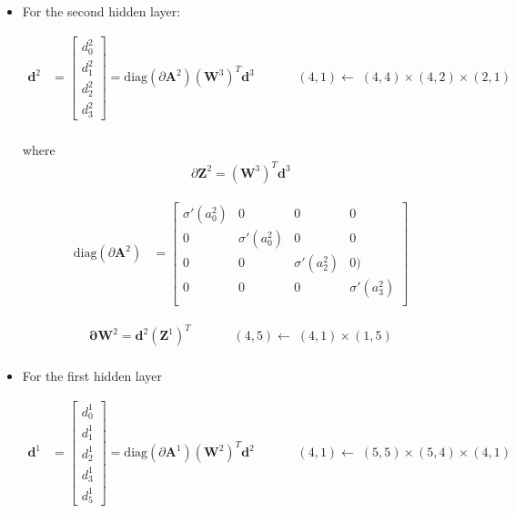 \documentclass{tufte-handout}
\begin{document}
\begin{itemize}
\item For the second hidden  layer:

\begin{align*}
\mathbf d^2  &= 
\begin{bmatrix} 
d_0^2\\ d_1^2\\ d_2^2\\d_3^2
\end{bmatrix} = 
\mathrm{diag}(\partial\mathbf A^2) (\mathbf W^3)^T \mathbf d^3   \;\;\;\;\;\;\;\;\;\;\;\; (4,1) \leftarrow \;  (4,4) \times (4,2) \times (2,1) \\
\end{align*}

where 
\begin{align*}
\partial \mathbf Z^2 = (\mathbf W^3)^T \mathbf d^3 
\end{align*}

\begin{align*}
\mathrm{diag}(\partial\mathbf A^2) &= 
\begin{bmatrix}
\sigma'(a_0^2) & 0 & 0 & 0\\
0  & \sigma'(a_0^2) & 0 & 0\\
0  & 0 & \sigma'(a_2^2) & 0) \\
0  & 0 & 0 & \sigma'(a_3^2)\\
\end{bmatrix}
\end{align*}

\begin{align*}
\mathbf \partial \mathbf W^2 = \mathbf d^2 (\mathbf Z^1)^T  \;\;\;\;\;\;\;\;\;\;\;\; (4,5) \leftarrow \; (4,1) \times (1,5) \\
\end{align*}

\item For the first hidden layer

\begin{align*}
\mathbf d^1  &= 
\begin{bmatrix} 
d_0^1\\ d_1^1\\ d_2^1\\d_3^1\\d_5^1
\end{bmatrix} = 
\mathrm{diag}(\partial\mathbf A^1) (\mathbf W^2)^T \mathbf d^2   \;\;\;\;\;\;\;\;\;\;\;\; (4,1) \leftarrow \;  (5,5) \times (5,4) \times (4,1) \\
\end{align*}


\end{itemize}
\end{document}
